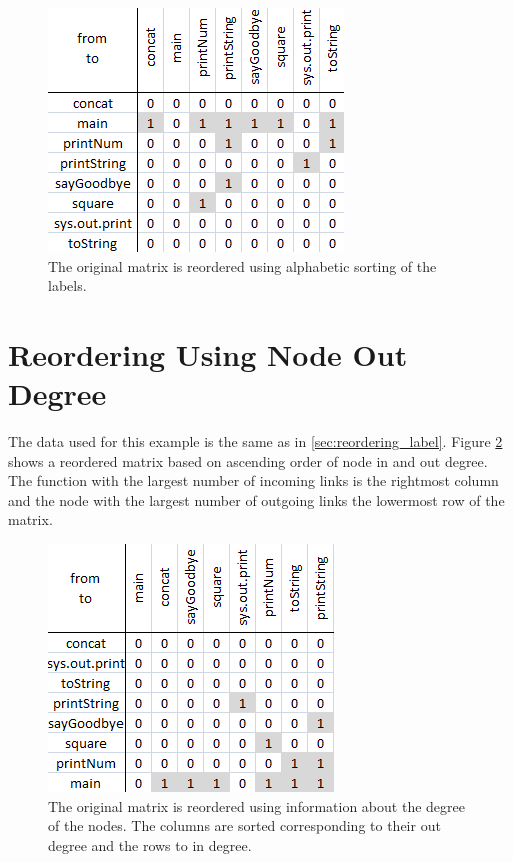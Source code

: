 \begin{figure}[tp]
  \centering
  \includegraphics[scale=0.9]
  {images/Reordering_Example_label.png}
  
  \caption[Reordered Matrix Based on Labels]{
  The original matrix is reordered using alphabetic sorting of the labels.
  }
  \label{fig:reordering_example_label}
\end{figure}


\section{Reordering Using Node Out Degree}
The data used for this example is the same as in \ref{sec:reordering_label}. Figure \ref{fig:reordering_example_degree} shows a reordered matrix based on ascending order of node in and out degree. The function with the largest number of incoming links is the rightmost column and the node with the largest number of outgoing links the lowermost row of the matrix.

\begin{figure}[tp]
  \centering
  \includegraphics[scale=0.9]
  {images/Reordering_Example_degree.png}
  
  \caption[Reordered Matrix Based on Node Degree]{
  The original matrix is reordered using information about the degree of the nodes. The columns are sorted corresponding to their out degree and the rows to in degree.
  }
  \label{fig:reordering_example_degree}
\end{figure}


